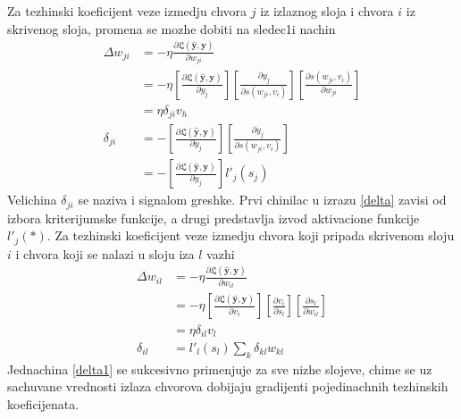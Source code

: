 \documentclass[a4paper, openany, oneside, 11pt]{book}
\begin{document}
Za tezhinski koeficijent veze izmedju chvora $j$ iz izlaznog sloja i chvora $i$ iz skrivenog sloja, promena se mozhe dobiti na sledec1i nachin
\begin{align}
\Delta w_{ji} &= -\eta\frac{\partial \mathfrak{L}\left(\mathbf{\hat{y}}, \mathbf{y}\right)}{\partial w_{ji}}\\
&=-\eta\left[\frac{\partial \mathfrak{L}\left(\mathbf{\hat{y}}, \mathbf{y}\right)}{\partial y_j}\right]\left[\frac{\partial y_j}{\partial s(w_{ji},v_i)}\right]\left[\frac{\partial s(w_{ji},v_i)}{\partial w_{ji}}\right]\\
&=\eta \delta_{ji}v_h\\
\delta_{ji} &=-\left[\frac{\partial \mathfrak{L}\left(\mathbf{\hat{y}}, \mathbf{y}\right)}{\partial y_j}\right]\left[\frac{\partial y_j}{\partial s(w_{ji},v_i)}\right] \label{delta}\\
&= -\left[\frac{\partial \mathfrak{L}\left(\mathbf{\hat{y}}, \mathbf{y}\right)}{\partial y_j}\right]l'_j(s_j)
\end{align}
Velichina $\delta_{ji}$ se naziva i signalom greshke. Prvi chinilac u izrazu \ref{delta} zavisi od izbora kriterijumske funkcije, a drugi predstavlja izvod aktivacione funkcije $l'_j(*)$. Za tezhinski koeficijent veze izmedju chvora koji pripada skrivenom sloju $i$ i chvora koji se nalazi u sloju iza $l$ vazhi
\begin{align}
\Delta w_{il} &= -\eta\frac{\partial \mathfrak{L}\left(\mathbf{\hat{y}}, \mathbf{y}\right)}{\partial w_{il}}\\
&=-\eta\left[\frac{\partial \mathfrak{L}\left(\mathbf{\hat{y}}, \mathbf{y}\right)}{\partial v_i}\right]\left[\frac{\partial v_i}{\partial s_l}\right]\left[\frac{\partial s_l}{\partial w_{il}}\right]\\
&=\eta \delta_{il}v_l\\
\delta_{il} &= l'_l(s_l)\sum_{k}\delta_{kl}w_{kl}\label{delta1}
\end{align}
Jednachina \ref{delta1} se sukcesivno primenjuje za sve nizhe slojeve, chime se uz sachuvane vrednosti izlaza chvorova dobijaju gradijenti pojedinachnih tezhinskih koeficijenata.
\end{document}
